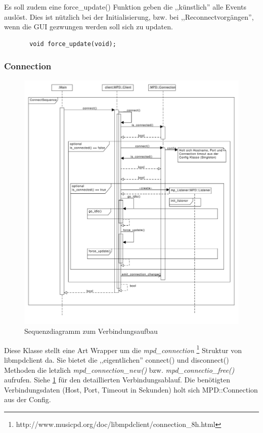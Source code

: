 Es soll zudem eine force\_update() Funktion geben die ,,künstlich'' alle Events auslöst.
Dies ist nützlich bei der Initialisierung, bzw. bei ,,Reconnectvorgängen'', wenn die GUI gezwungen werden
soll sich zu updaten.
\begin{verbatim}
       void force_update(void);
\end{verbatim}

%
%

\subsubsection{Connection}
\begin{figure}[htb!]
	\centering
        \includegraphics[scale=0.5]{ConnectSequence.pdf}
	\caption{Sequenzdiagramm zum Verbindungsaufbau}
	\label{seq_client_connect}
\end{figure}
Diese Klasse stellt eine Art Wrapper um die \textit{mpd\_connection}
\footnote{http://www.musicpd.org/doc/libmpdclient/connection\_8h.html} Struktur von libmpdclient da.
Sie bietet die ,,eigentlichen'' connect() und disconnect() Methoden die letzlich \textit{mpd\_connection\_new()} bzw. \textit{mpd\_connectio\_free()} aufrufen. Siehe \ref{seq_client_connect} für den detaillierten Verbindungsablauf. Die benötigten Verbindungsdaten (Host, Port, Timeout in Sekunden) holt sich MPD::Connection aus der Config.
